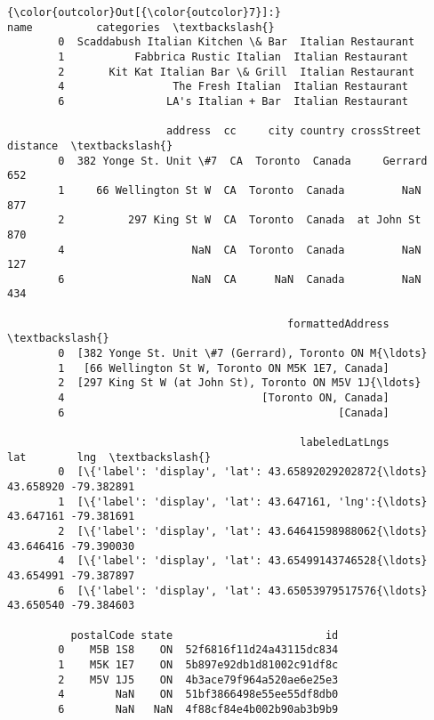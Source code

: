 \documentclass[11pt]{article}
\begin{document}
\begin{Verbatim}[commandchars=\\\{\}]
{\color{outcolor}Out[{\color{outcolor}7}]:}                                name          categories  \textbackslash{}
        0  Scaddabush Italian Kitchen \& Bar  Italian Restaurant   
        1           Fabbrica Rustic Italian  Italian Restaurant   
        2       Kit Kat Italian Bar \& Grill  Italian Restaurant   
        4                 The Fresh Italian  Italian Restaurant   
        6                LA's Italian + Bar  Italian Restaurant   
        
                         address  cc     city country crossStreet  distance  \textbackslash{}
        0  382 Yonge St. Unit \#7  CA  Toronto  Canada     Gerrard       652   
        1     66 Wellington St W  CA  Toronto  Canada         NaN       877   
        2          297 King St W  CA  Toronto  Canada  at John St       870   
        4                    NaN  CA  Toronto  Canada         NaN       127   
        6                    NaN  CA      NaN  Canada         NaN       434   
        
                                            formattedAddress  \textbackslash{}
        0  [382 Yonge St. Unit \#7 (Gerrard), Toronto ON M{\ldots}   
        1   [66 Wellington St W, Toronto ON M5K 1E7, Canada]   
        2  [297 King St W (at John St), Toronto ON M5V 1J{\ldots}   
        4                               [Toronto ON, Canada]   
        6                                           [Canada]   
        
                                              labeledLatLngs        lat        lng  \textbackslash{}
        0  [\{'label': 'display', 'lat': 43.65892029202872{\ldots}  43.658920 -79.382891   
        1  [\{'label': 'display', 'lat': 43.647161, 'lng':{\ldots}  43.647161 -79.381691   
        2  [\{'label': 'display', 'lat': 43.64641598988062{\ldots}  43.646416 -79.390030   
        4  [\{'label': 'display', 'lat': 43.65499143746528{\ldots}  43.654991 -79.387897   
        6  [\{'label': 'display', 'lat': 43.65053979517576{\ldots}  43.650540 -79.384603   
        
          postalCode state                        id  
        0    M5B 1S8    ON  52f6816f11d24a43115dc834  
        1    M5K 1E7    ON  5b897e92db1d81002c91df8c  
        2    M5V 1J5    ON  4b3ace79f964a520ae6e25e3  
        4        NaN    ON  51bf3866498e55ee55df8db0  
        6        NaN   NaN  4f88cf84e4b002b90ab3b9b9  
\end{Verbatim}
            
\end{document}
